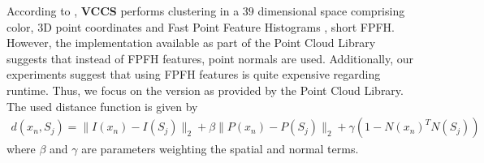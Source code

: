 According to \cite{PaponAbramovSchoelerWoergoetter:2013}, \textbf{VCCS} performs clustering in a $39$ dimensional space comprising color, 3D point coordinates and Fast Point Feature Histograms \cite{RusuBlodowBeetz:2009}, short FPFH. However, the implementation available as part of the Point Cloud Library suggests that instead of FPFH features, point normals are used. Additionally, our experiments suggest that using FPFH features is quite expensive regarding runtime. Thus, we focus on the version as provided by the Point Cloud Library. The used distance function is given by
\begin{align}
	\label{eq:superpixel-segmentation-depth-vccs-distance}
	d(x_n, S_j) = \|I(x_n) - I(S_j)\|_2 + \beta\|P(x_n) - P(S_j)\|_2 + \gamma \left(1 - N(x_n)^T N(S_j)\right)
\end{align}
where $\beta$ and $\gamma$ are parameters weighting the spatial and normal terms.

